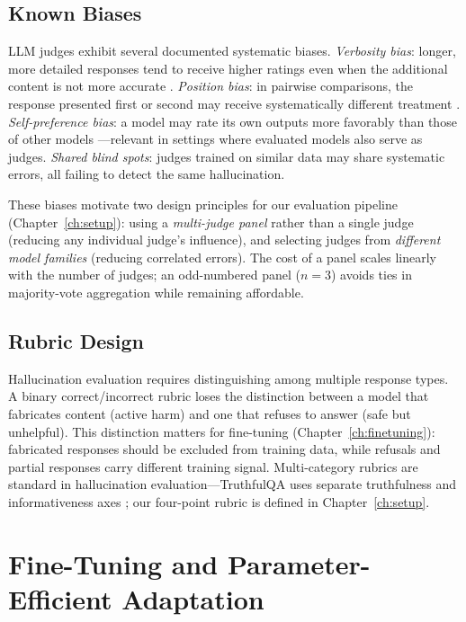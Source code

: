 \subsection{Known Biases}
\label{sec:bg-judge-biases}

LLM judges exhibit several documented systematic biases. \emph{Verbosity bias}: longer, more detailed responses tend to receive higher ratings even when the additional content is not more accurate \citep{zheng2023judging}. \emph{Position bias}: in pairwise comparisons, the response presented first or second may receive systematically different treatment \citep{zheng2023judging}. \emph{Self-preference bias}: a model may rate its own outputs more favorably than those of other models \citep{wataoka2024selfpreference, panickssery2024llm}---relevant in settings where evaluated models also serve as judges. \emph{Shared blind spots}: judges trained on similar data may share systematic errors, all failing to detect the same hallucination.

These biases motivate two design principles for our evaluation pipeline (Chapter~\ref{ch:setup}): using a \emph{multi-judge panel} rather than a single judge (reducing any individual judge's influence), and selecting judges from \emph{different model families} (reducing correlated errors). The cost of a panel scales linearly with the number of judges; an odd-numbered panel ($n = 3$) avoids ties in majority-vote aggregation while remaining affordable.

\subsection{Rubric Design}
\label{sec:bg-rubric}

Hallucination evaluation requires distinguishing among multiple response types. A binary correct/incorrect rubric loses the distinction between a model that fabricates content (active harm) and one that refuses to answer (safe but unhelpful). This distinction matters for fine-tuning (Chapter~\ref{ch:finetuning}): fabricated responses should be excluded from training data, while refusals and partial responses carry different training signal. Multi-category rubrics are standard in hallucination evaluation---TruthfulQA uses separate truthfulness and informativeness axes \citep{lin2022truthfulqa}; our four-point rubric is defined in Chapter~\ref{ch:setup}.

\section{Fine-Tuning and Parameter-Efficient Adaptation}
\label{sec:bg-finetuning}

